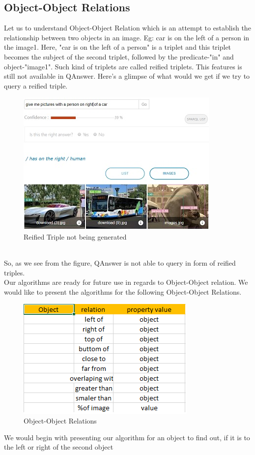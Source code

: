 \documentclass[12pt]{article}
\begin{document}
\subsection{Object-Object Relations}
Let us to understand Object-Object Relation which is an attempt to establish the relationship between two objects in an image. Eg: car is on the left of a person in the image1. Here, "car is on the left of a person" is a triplet and this triplet becomes the subject of the second triplet, followed by the predicate-"in" and object-"image1". Such kind of triplets are called reified triplets. This features is still not available in QAnswer. Here's a glimpse of what would we get if we try to query a reified triple.\\
\newpage
\begin{figure}[!h]
\center
\includegraphics{images/objectObjectRelation(basics).jpg}
\caption{Reified Triple not being generated}
\end{figure}\\
 So, as we see from the figure, QAnswer is not able to query in form of reified triples.\\ Our algorithms are ready for future use in regards to Object-Object relation. We would like to present the algorithms for the following Object-Object Relations. \\
 \begin{figure}[!h]
\center
 \includegraphics{OORelation.png}
\caption{Object-Object Relations}
\end{figure} 
\newpage
We would begin with presenting our algorithm for an object to find out, if it is to the left or right of the second object\\
\end{document}
